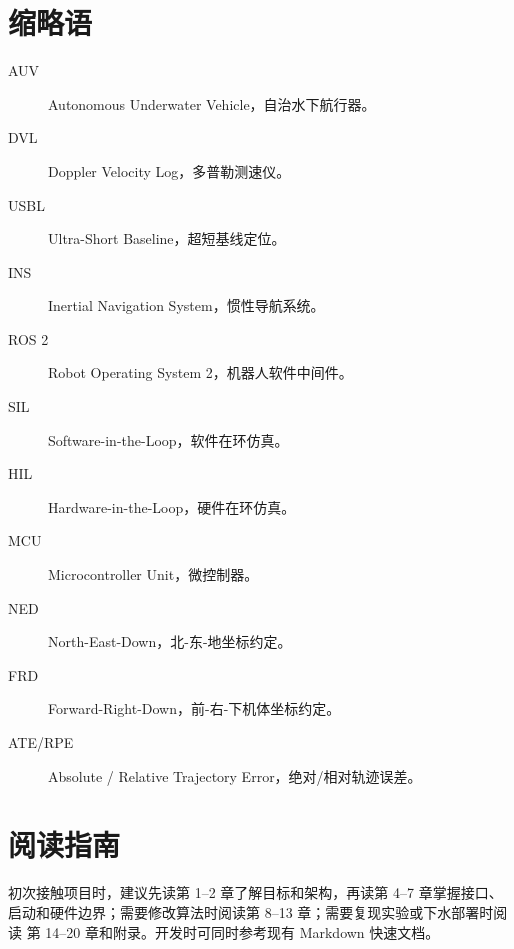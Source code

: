 \documentclass[UTF8,openany,oneside]{ctexbook}
\begin{document}
\chapter*{缩略语}
\begin{description}
  \item[AUV] Autonomous Underwater Vehicle，自治水下航行器。
  \item[DVL] Doppler Velocity Log，多普勒测速仪。
  \item[USBL] Ultra-Short Baseline，超短基线定位。
  \item[INS] Inertial Navigation System，惯性导航系统。
  \item[ROS 2] Robot Operating System 2，机器人软件中间件。
  \item[SIL] Software-in-the-Loop，软件在环仿真。
  \item[HIL] Hardware-in-the-Loop，硬件在环仿真。
  \item[MCU] Microcontroller Unit，微控制器。
  \item[NED] North-East-Down，北-东-地坐标约定。
  \item[FRD] Forward-Right-Down，前-右-下机体坐标约定。
  \item[ATE/RPE] Absolute / Relative Trajectory Error，绝对/相对轨迹误差。
\end{description}

\chapter*{阅读指南}
初次接触项目时，建议先读第 1--2 章了解目标和架构，再读第 4--7 章掌握接口、
启动和硬件边界；需要修改算法时阅读第 8--13 章；需要复现实验或下水部署时阅读
第 14--20 章和附录。开发时可同时参考现有 Markdown 快速文档。

\tableofcontents
\listoffigures
\listoftables

\mainmatter





















\appendix







\backmatter
\printbibliography[heading=bibintoc,title={参考文献与资料}]
\end{document}
